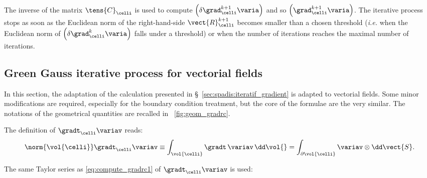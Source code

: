 The inverse of the matrix $\tens{C}_{\celli}$ is used to compute $\left( \delta \grad_{\celli}^{k+1} \varia \right)$
and so $\left( \grad^{k+1}_{\celli} \varia \right)$. The iterative process stops as soon as the Euclidean norm of the right-hand-side $\vect{R}^{k+1}_{\celli}$ becomes smaller than a chosen threshold (\emph{i.e.} when the Euclidean norm
of $\left( \delta \grad^{k}_{\celli} \varia \right)$ falls under a threshold) or when the number of iterations reaches the maximal number of iterations.

\subsection{Green Gauss iterative process for vectorial fields}\label{sec:spadis:iteratif_gradient_vectors}
In this section, the adaptation of the calculation presented in \S~\ref{sec:spadis:iteratif_gradient} is adapted to
vectorial fields. Some minor modifications are required, especially for the boundary condition treatment, but the core of the
formulae are the very similar. The notations of the geometrical quantities are recalled in \figurename~\ref{fig:geom_gradrc}.

The definition of $\gradt_{\celli} \variav $ reads:
\begin{equation}
\norm{\vol{\celli}} \gradt_{\celli} \variav \equiv  \displaystyle \int_{\vol{\celli}}{\gradt \, \variav \, \dd \vol{} } = \int_{\partial \vol{\celli}} \variav \otimes \dd \vect{S}.
\end{equation}

The same Taylor series as \eqref{eq:compute_gradrc1} of $\gradt_{\celli} \variav$ is used:

